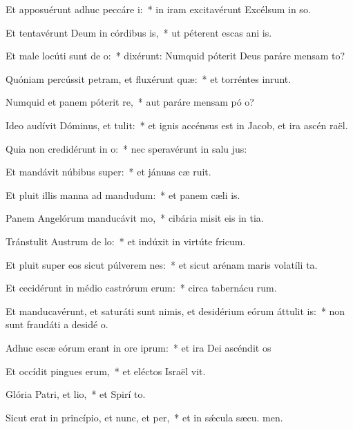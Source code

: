 \item Et apposuérunt adhuc peccáre i:~* in iram excitavérunt Excélsum in so.
\item Et tentavérunt Deum in córdibus is,~* ut péterent escas ani is.
\item Et male locúti sunt de o:~* dixérunt: Numquid póterit Deus paráre mensam  to?
\item Quóniam percússit petram, et fluxérunt quæ:~* et torréntes inrunt.
\item Numquid et panem póterit re,~* aut paráre mensam pó o?
\item Ideo audívit Dóminus, et tulit:~* et ignis accénsus est in Jacob, et ira ascén  raël.
\item Quia non credidérunt in o:~* nec speravérunt in salu jus:
\item Et mandávit núbibus super:~* et jánuas cæ ruit.
\item Et pluit illis manna ad mandudum:~* et panem cæli  is.
\item Panem Angelórum manducávit mo,~* cibária misit eis in tia.
\item Tránstulit Austrum de lo:~* et indúxit in virtúte  fricum.
\item Et pluit super eos sicut púlverem nes:~* et sicut arénam maris volatíli ta.
\item Et cecidérunt in médio castrórum erum:~* circa tabernácu rum.
\item Et manducavérunt, et saturáti sunt nimis, et desidérium eórum áttulit is:~* non sunt fraudáti a desidé o.
\item Adhuc escæ eórum erant in ore iprum:~* et ira Dei ascéndit  os
\item Et occídit pingues erum,~* et eléctos Israël vit.
\item Glória Patri, et lio,~* et Spirí to.
\item Sicut erat in princípio, et nunc, et per,~* et in sǽcula sæcu. men.
